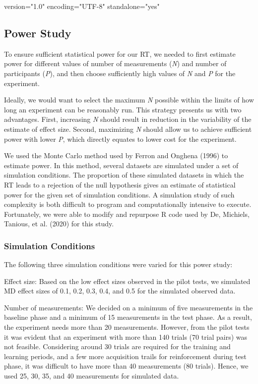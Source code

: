 version="1.0" encoding="UTF-8" standalone="yes" \documentclass{article}
\begin{document}
\subsection{Power Study}

To ensure sufficient statistical power for our RT, we needed to first estimate power for different values of number of measurements (\emph{N}) and number of participants (\emph{P}), and then choose sufficiently high values of \emph{N} and \emph{P} for the experiment. 

Ideally, we would want to select the maximum \emph{N} possible within the limits of how long an experiment can be reasonably run. This strategy presents us with two advantages. First, increasing \emph{N} should result in reduction in the variability of the estimate of effect size. Second, maximizing \emph{N} should allow us to achieve sufficient power with lower \emph{P}, which directly equates to lower cost for the experiment.

We used the Monte Carlo method used by Ferron and Onghena (1996) to estimate power. In this method, several datasets are simulated under a set of simulation conditions. The proportion of these simulated datasets in which the RT leads to a rejection of the null hypothesis gives an estimate of statistical power for the given set of simulation conditions. A simulation study of such complexity is both difficult to program and computationally intensive to execute. Fortunately, we were able to modify and repurpose R code used by De, Michiels, Tanious, et al. (2020) for this study. 

\subsubsection{Simulation Conditions}

The following three simulation conditions were varied for this power study:

Effect size: Based on the low effect sizes observed in the pilot tests, we simulated MD effect sizes of 0.1, 0.2, 0.3, 0.4, and 0.5 for the simulated observed data.

Number of measurements: We decided on a minimum of five measurements in the baseline phase and a minimum of 15 measurements in the test phase. As a result, the experiment needs more than 20 measurements. However, from the pilot tests it was evident that an experiment with more than 140 trials (70 trial pairs) was not feasible. Considering around 30 trials are required for the training and learning periods, and a few more acquisition trails for reinforcement during test phase, it was difficult to have more than 40 measurements (80 trials). Hence, we used 25, 30, 35, and 40 measurements for simulated data. 
\end{document}
